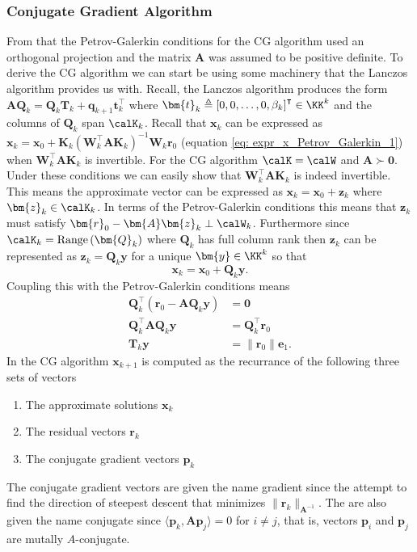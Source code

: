 \subsubsection{Conjugate Gradient Algorithm}\label{Section1.1.5}

From  that the Petrov-Galerkin conditions for the CG algorithm used an orthogonal projection and the matrix $\bm{A}$ was assumed to be positive definite. To derive the CG algorithm we can start be using some machinery that the Lanczos algorithm provides us with. Recall, the Lanczos algorithm produces the form $\bm{A}\bm{Q}_k = \bm{Q}_k \bm{T}_k + \bm{q}_{k+1} \bm{t}_{k}^{\intercal}$ where $\bm{t}_{k} \triangleq \left[ 0,0, \ldots , 0, \beta_k \right]^{\intercal} \in \KK^k$ and the columns of $\bm{Q}_k$ span $\calK_k$. Recall that $\bm{x}_k$ can be expressed as $\bm{x}_k = \bm{x}_0 + \bm{K}_k \left( \bm{W}_k^{\intercal} \bm{A} \bm{K}_k \right)^{-1} \bm{W}_k \bm{r}_0$ (equation \ref{eq: expr_x_Petrov_Galerkin_1}) when $\bm{W}_k^{\intercal} \bm{A} \bm{K}_k$ is invertible. For the CG algorithm $\calK = \calW$ and $\bm{A} \succ \bm{0}$. Under these conditions we can easily show that $\bm{W}_k^{\intercal} \bm{A} \bm{K}_k$ is indeed invertible. This means the approximate vector can be expressed as $\bm{x}_k = \bm{x}_0 + \bm{z}_k$ where $\bm{z}_k \in \calK_k$. In terms of the Petrov-Galerkin conditions this means that $\bm{z}_k$ must satisfy $\bm{r}_0 - \bm{A} \bm{z}_k \perp \calW_k$. Furthermore since $\calK_k = \operatorname{Range} \left( \bm{Q}_k \right)$ where $\bm{Q}_k$ has full column rank then $\bm{z}_k$ can be represented as $\bm{z}_k = \bm{Q}_k \bm{y}$ for a unique $\bm{y} \in \KK^k$ so that
\begin{equation} \label{eq: x_eq_Qky}
    \bm{x}_k = \bm{x}_0 + \bm{Q}_k \bm{y}.
\end{equation}
Coupling this with the Petrov-Galerkin conditions means
\begin{align} \label{eq: Tky_eq_normr0e1}
    \bm{Q}_k^{\intercal} \left( \bm{r}_0 - \bm{A} \bm{Q}_k \bm{y} \right) & = \bm{0}                        \nonumber \\
    \bm{Q}_k^{\intercal} \bm{A} \bm{Q}_k \bm{y}                           & = \bm{Q}_k^{\intercal} \bm{r}_0 \nonumber \\
    \bm{T}_k \bm{y}                                                       & = \| \bm{r}_0 \| \bm{e}_1.
\end{align}
In the CG algorithm $\bm{x}_{k+1}$ is computed as the recurrance of the following three sets of vectors
\begin{enumerate}
    \item The approximate solutions $\bm{x}_{k}$
    \item The residual vectors $\bm{r}_{k}$
    \item The conjugate gradient vectors $\bm{p}_k$
\end{enumerate}
The conjugate gradient vectors are given the name gradient since the attempt to find the direction of steepest descent that minimizes $\| \bm{r}_{k} \|_{\bm{A}^{-1}}$. The are also given the name conjugate since $\langle \bm{p}_k, \bm{A} \bm{p}_j \rangle = 0$ for $i \neq j$, that is, vectors $\bm{p}_i$ and $\bm{p}_j$ are mutally $A$-conjugate.

